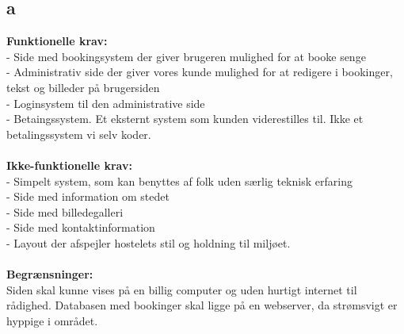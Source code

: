 \documentclass[12pt,a4paper]{article}
\begin{document}
\subsection{a}
\textbf{Funktionelle krav:} \\
- Side med bookingsystem der giver brugeren mulighed for at booke senge\\
- Administrativ side der giver vores kunde mulighed for at redigere i bookinger, tekst og billeder på brugersiden\\
- Loginsystem til den administrative side\\
- Betaingssystem. Et eksternt system som kunden viderestilles til. Ikke et betalingssystem vi selv koder.\\\\
       \textbf{Ikke-funktionelle krav:} \\
- Simpelt system, som kan benyttes af folk uden særlig teknisk erfaring\\
- Side med information om stedet\\
- Side med billedegalleri\\
- Side med kontaktinformation\\
- Layout der afspejler hostelets stil og holdning til miljøet. \\\\
      \textbf{Begrænsninger:} \\
	Siden skal kunne vises på en billig computer og uden hurtigt internet til rådighed. Databasen med bookinger skal ligge på en webserver, da strømsvigt er hyppige i området.
\newpage
\end{document}
